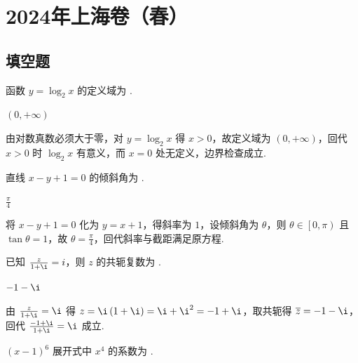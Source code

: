 \chapter{2024年上海卷（春）}

\section{填空题}

\begin{problem}
函数 \(y=\log_2 x\) 的定义域为\fillinblank{} .
\end{problem}

\begin{answer}
\(\left(0,+\infty\right)\)
\end{answer}

\begin{solution}
由对数真数必须大于零，对 \(y=\log_{2}x\) 得 \(x>0\)，故定义域为 \(\left(0,+\infty\right)\)，回代 \(x>0\) 时 \(\log_{2}x\) 有意义，而 \(x=0\) 处无定义，边界检查成立.
\end{solution}

\begin{problem}
直线 \(x-y+1=0\) 的倾斜角为\fillinblank{} .
\end{problem}

\begin{answer}
\(\frac{\pi}{4}\)
\end{answer}

\begin{solution}
将 \(x-y+1=0\) 化为 \(y=x+1\)，得斜率为 \(1\)，设倾斜角为 \(\theta\)，则 \(\theta\in\left[0,\pi\right)\) 且 \(\tan\theta=1\)，故 \(\theta=\frac{\pi}{4}\)，回代斜率与截距满足原方程.
\end{solution}

\begin{problem}
已知 \(\frac{z}{1+\i}=i\)，则 \(z\) 的共轭复数为\fillinblank{} .
\end{problem}

\begin{answer}
\(-1-\i\)
\end{answer}

\begin{solution}
由 \(\frac{z}{1+\i}=\i\) 得 \(z=\i\left(1+\i\right)=\i+\i^{2}=-1+\i\)，取共轭得 \(\overline{z}=-1-\i\)，回代 \(\frac{-1+\i}{1+\i}=\i\) 成立.
\end{solution}

\begin{problem}
\(\left(x-1\right)^6\) 展开式中 \(x^4\) 的系数为\fillinblank{} .
\end{problem}


